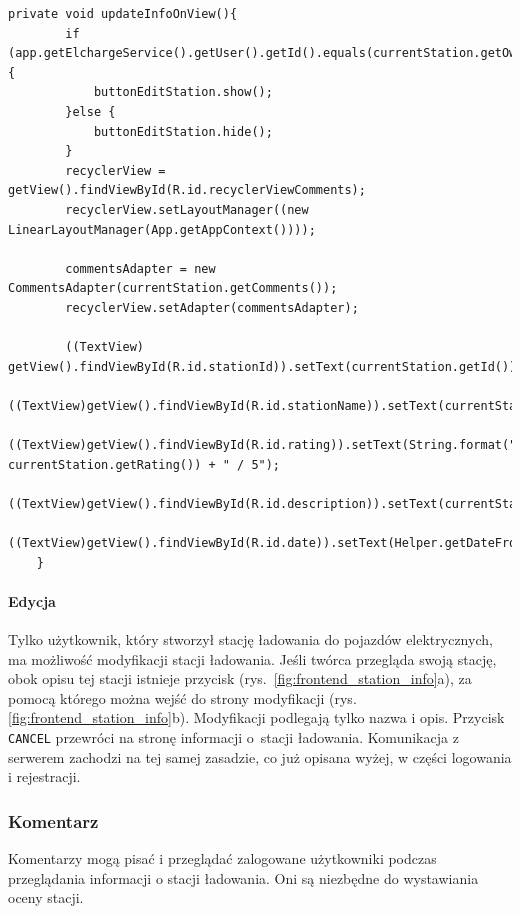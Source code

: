 \begin{lstlisting}[label=list:updateInfoOnView,caption=Odnowienie informacji o stacji na ekranie.,basicstyle=\tiny\ttfamily]
    private void updateInfoOnView(){
        if (app.getElchargeService().getUser().getId().equals(currentStation.getOwnerID())){
            buttonEditStation.show();
        }else {
            buttonEditStation.hide();
        }
        recyclerView = getView().findViewById(R.id.recyclerViewComments);
        recyclerView.setLayoutManager((new LinearLayoutManager(App.getAppContext())));

        commentsAdapter = new CommentsAdapter(currentStation.getComments());
        recyclerView.setAdapter(commentsAdapter);

        ((TextView) getView().findViewById(R.id.stationId)).setText(currentStation.getId());
        ((TextView)getView().findViewById(R.id.stationName)).setText(currentStation.getStationName());
        ((TextView)getView().findViewById(R.id.rating)).setText(String.format("%.2f", currentStation.getRating()) + " / 5");
        ((TextView)getView().findViewById(R.id.description)).setText(currentStation.getDescription());
        ((TextView)getView().findViewById(R.id.date)).setText(Helper.getDateFromISO8601(currentStation.getUpdateAt()));
    }
\end{lstlisting}

\paragraph{Edycja\newline}
Tylko użytkownik, który stworzył stację ładowania do pojazdów elektrycznych, ma możliwość modyfikacji stacji ładowania. Jeśli twórca przegląda swoją stację, obok opisu tej stacji istnieje przycisk (rys.~\ref{fig:frontend_station_info}a), za pomocą którego można wejść do strony modyfikacji (rys. \ref{fig:frontend_station_info}b).
Modyfikacji podlegają tylko nazwa i opis. Przycisk \texttt{CANCEL} przewróci na stronę informacji o~stacji ładowania. Komunikacja z serwerem zachodzi na tej samej zasadzie, co już opisana wyżej, w części logowania i rejestracji.

\subsubsection{Komentarz}
Komentarzy mogą pisać i przeglądać zalogowane użytkowniki podczas przeglądania informacji o stacji ładowania. Oni są niezbędne do wystawiania oceny stacji.

